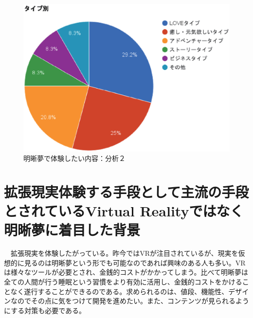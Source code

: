 \begin{figure}[htbp]
\begin{center}
\includegraphics[width=15cm]{eps/dreamType.eps}
\caption{明晰夢で体験したい内容：分析２}
\label{明晰夢で体験したい内容：分析２}
\end{center}
\end{figure}

\section{拡張現実体験する手段として主流の手段とされているVirtual Realityではなく明晰夢に着目した背景}
　拡張現実を体験したがっている。昨今ではVRが注目されているが、現実を仮想的に見るのは明晰夢という形でも可能なのであれば興味のある人も多い。VRは様々なツールが必要とされ、金銭的コストがかかってしまう。比べて明晰夢は全ての人間が行う睡眠という習慣をより有効に活用し、金銭的コストをかけることなく遂行することができるのである。求められるのは、値段、機能性、デザインなのでその点に気をつけて開発を進めたい。また、コンテンツが見られるようにする対策も必要である。

